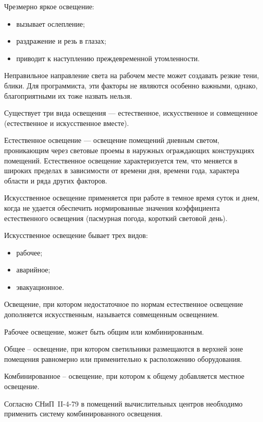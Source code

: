 Чрезмерно яркое освещение:
\begin{itemize}
	\item  вызывает ослепление;
	\item  раздражение и резь в глазах;
	\item  приводит к наступлению преждевременной утомленности.
\end{itemize}

Неправильное направление света на рабочем месте может создавать резкие
тени, блики. Для программиста, эти факторы не являются особенно важными, 
однако, благоприятными их тоже назвать нельзя.

Существует три вида освещения --- естественное, искусственное и совмещенное
(естественное и искусственное вместе).

Естественное освещение --- освещение помещений дневным светом, проникающим
через световые проемы в наружных ограждающих конструкциях помещений.
Естественное освещение характеризуется тем, что меняется в широких пределах
в зависимости от времени  дня, времени года, характера области и ряда других
факторов.

Искусственное освещение применяется при работе в темное время суток и днем,
когда не удается обеспечить нормированные значения коэффициента
естественного освещения (пасмурная погода, короткий световой день).

Искусственное освещение бывает трех видов: 

\begin{itemize}
	\item  рабочее;
	\item  аварийное;
	\item  эвакуационное.
\end{itemize}

Освещение, при котором недостаточное по нормам естественное освещение
дополняется искусственным, называется совмещенным освещением.

Рабочее освещение, может быть общим или комбинированным.

Общее – освещение, при котором светильники размещаются в верхней зоне
помещения равномерно или применительно к расположению
оборудования. 

Комбинированное – освещение, при котором к общему 
добавляется местное освещение.


Согласно \mbox{СНиП II-4-79} в помещений вычислительных центров необходимо
применить систему комбинированного освещения.

